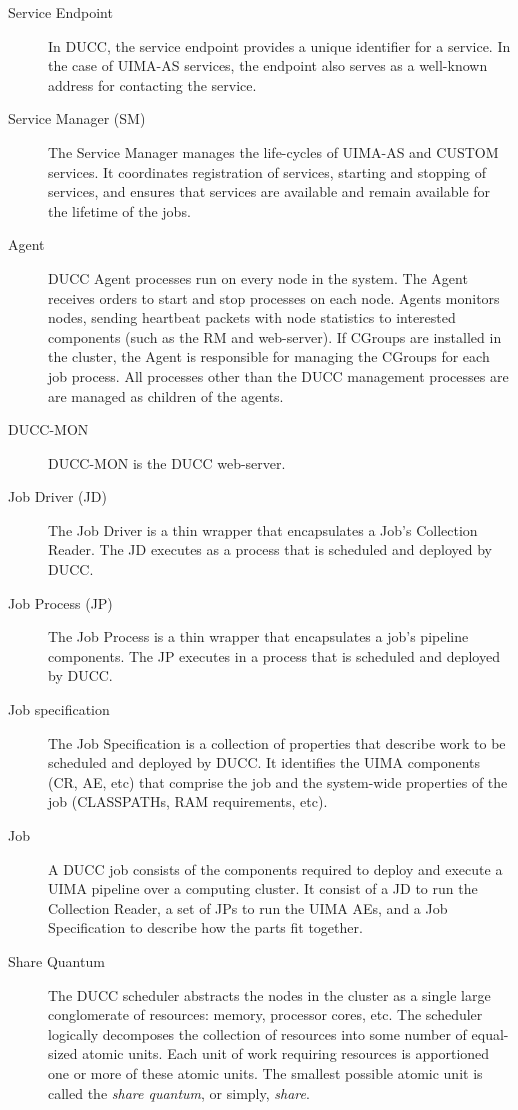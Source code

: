 \begin{description}
\item[Service Endpoint] In DUCC, the service endpoint provides a unique identifier for a service. In
  the case of UIMA-AS services, the endpoint also serves as a well-known address for contacting the
  service. 

\item[Service Manager (SM)] The Service Manager manages the life-cycles of UIMA-AS and CUSTOM
  services. It coordinates registration of services, starting and stopping of services, and ensures
  that services are available and remain available for the lifetime of the jobs.

\item[Agent] DUCC Agent processes run on every node in the system. The Agent receives orders to
  start and stop processes on each node. Agents monitors nodes, sending heartbeat packets with node
  statistics to interested components (such as the RM and web-server). If CGroups are installed in
  the cluster, the Agent is responsible for managing the CGroups for each job process. All processes
  other than the DUCC management processes are are managed as children of the agents.

\item[DUCC-MON]  DUCC-MON is the DUCC web-server.

\item[Job Driver (JD)]The Job Driver is a thin wrapper that encapsulates a Job's Collection
  Reader. The JD executes as a process that is scheduled and deployed by DUCC.

\item[Job Process (JP)] The Job Process is a thin wrapper that encapsulates a job's pipeline
  components. The JP executes in a process that is scheduled and deployed by DUCC.

\item[Job specification] The Job Specification is a collection of properties that describe work to be
  scheduled and deployed by DUCC. It
  identifies the UIMA components (CR, AE, etc) that comprise the job and the system-wide
  properties of the job (CLASSPATHs, RAM requirements, etc). 

\item[Job] A DUCC job consists of the components required to deploy and execute a UIMA pipeline over
  a computing cluster. It consist of a JD to run the Collection Reader, a set of JPs to run the UIMA
  AEs, and a Job Specification to describe how the parts fit together.

\item[Share Quantum] The DUCC scheduler abstracts the nodes in the cluster as a single large
  conglomerate of resources: memory, processor cores, etc.  The scheduler logically decomposes 
  the collection of resources into some number of equal-sized atomic units.  Each unit of work requiring
  resources is apportioned one or more of these atomic units.  The smallest possible atomic 
  unit is called the {\em share quantum}, or simply, {\em share}.


\end{description}
